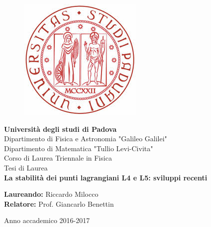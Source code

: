 \documentclass[a4paper,11pt,titlepage]{report}
\makeatletter
\theoremstyle{definition}
\theoremstyle{plain}
\newcommand\frontmatter{%
	\cleardoublepage
	\pagenumbering{arabic}}
\makeatother
\begin{document}
	
\fancyhf{}
\fancyhead[LE,RO]{\thepage}
\fancyhead[RE]{\textit{ \nouppercase{\leftmark}} }
\fancyhead[LO]{\textit{ \nouppercase{\rightmark}} }


\frontmatter


\begin{titlepage}
\begin{center}
\begin{figure}
\centering
\includegraphics[scale=0.3]{logo.png}
\end{figure}
\large\textbf{ {Università degli studi di Padova}}\\
\vspace{6em}
\Large{Dipartimento di Fisica e Astronomia "Galileo Galilei"}\\
\vspace{2em}
\Large{Dipartimento di Matematica "Tullio Levi-Civita"}\\
\vspace{2em}
\large{Corso di Laurea Triennale in Fisica}\\
\vspace{5em}
\large{Tesi di Laurea}\\
\LARGE{\textbf{La stabilità dei punti lagrangiani L4 e L5: sviluppi recenti}}\\
\vspace{5em}
\end{center}
\Large\textbf{{Laureando: }}\hspace{1.5em}\Large{Riccardo Milocco}\\

\Large\textbf{{Relatore: }}\hspace{1.2em}\Large{Prof. Giancarlo Benettin}\\
\vspace{4em}
\begin{center}
\large{Anno accademico 2016-2017}
\end{center}
\end{titlepage}
\end{document}
